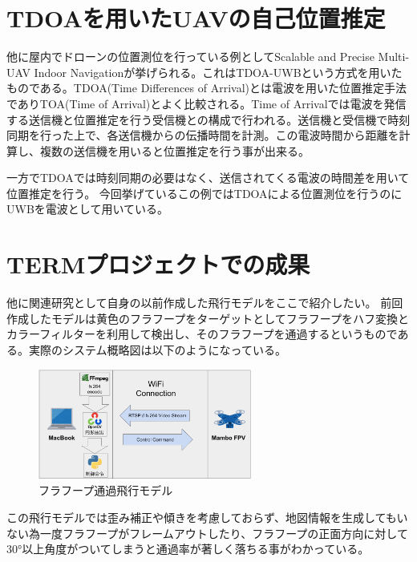 \section{TDOAを用いたUAVの自己位置推定}
他に屋内でドローンの位置測位を行っている例としてScalable and Precise Multi-UAV Indoor Navigation\cite{TDOA-UWB}が挙げられる。これはTDOA-UWBという方式を用いたものである。TDOA(Time Differences of Arrival)とは電波を用いた位置推定手法でありTOA(Time of Arrival)とよく比較される。Time of Arrivalでは電波を発信する送信機と位置推定を行う受信機との構成で行われる。送信機と受信機で時刻同期を行った上で、各送信機からの伝播時間を計測。この電波時間から距離を計算し、複数の送信機を用いると位置推定を行う事が出来る。

一方でTDOAでは時刻同期の必要はなく、送信されてくる電波の時間差を用いて位置推定を行う。
今回挙げているこの例ではTDOAによる位置測位を行うのにUWBを電波として用いている。


\section{TERMプロジェクトでの成果}
他に関連研究として自身の以前作成した飛行モデルをここで紹介したい。
前回作成したモデルは黄色のフラフープをターゲットとしてフラフープをハフ変換とカラーフィルターを利用して検出し、そのフラフープを通過するというものである。実際のシステム概略図は以下のようになっている。

\begin{figure}[htbp]
  \begin{center}
    \includegraphics[clip,width=7.0cm]{img/term-system.png}
    \caption{フラフープ通過飛行モデル}
    \label{fig:hoop}
  \end{center}
\end{figure}

この飛行モデルでは歪み補正や傾きを考慮しておらず、地図情報を生成してもいない為一度フラフープがフレームアウトしたり、フラフープの正面方向に対して30°以上角度がついてしまうと通過率が著しく落ちる事がわかっている。



